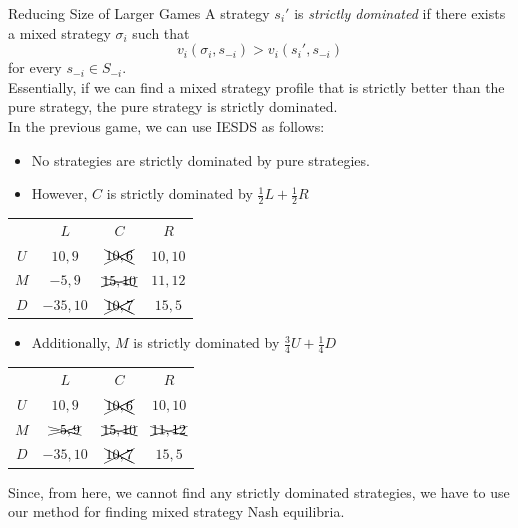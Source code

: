 \documentclass[10pt]{extarticle}
\begin{document}
  \begin{problem}{Reducing Size of Larger Games}
    A strategy $s_i'$ is \textit{strictly dominated} if there exists a mixed strategy $\sigma_i$ such that
    \[
      v_i(\sigma_i,s_{-i}) > v_i(s_i',s_{-i})
    \] 
    for every $s_{-i}\in S_{-i}$.\\

    Essentially, if we can find a mixed strategy profile that is strictly better than the pure strategy, the pure strategy is strictly dominated.\\

    In the previous game, we can use IESDS as follows:
    \begin{itemize}
      \item No strategies are strictly dominated by pure strategies.
      \item However, $C$ is strictly dominated by $\frac{1}{2}L + \frac{1}{2}R$
    \end{itemize}
    \begin{center}
      \renewcommand{\arraystretch}{1.5}
      \begin{tabular}{c|c|c|c|}
        \multicolumn{1}{c}{} & \multicolumn{1}{c}{$L$} & \multicolumn{1}{c}{$C$} & \multicolumn{1}{c}{$R$}\\
        \cline{2-4}
        $U$ & $10,9$ & $\xcancel{10,6}$ & $10,10$ \\
        \cline{2-4}
        $M$ & $-5,9$ & $\xcancel{15,10}$ & $11,12$\\
        \cline{2-4}
        $D$ & $-35,10$ & $\xcancel{10,7}$ & $15,5$\\
        \cline{2-4}
      \end{tabular}
    \end{center}
    \begin{itemize}
      \item Additionally, $M$ is strictly dominated by $\frac{3}{4}U + \frac{1}{4}D$
    \end{itemize}
    \begin{center}
      \renewcommand{\arraystretch}{1.5}
      \begin{tabular}{c|c|c|c|}
        \multicolumn{1}{c}{} & \multicolumn{1}{c}{$L$} & \multicolumn{1}{c}{$C$} & \multicolumn{1}{c}{$R$}\\
        \cline{2-4}
        $U$ & $10,9$ & $\xcancel{10,6}$ & $10,10$ \\
        \cline{2-4}
        $M$ & $\xcancel{-5,9}$ & $\xcancel{15,10}$ & $\xcancel{11,12}$\\
        \cline{2-4}
        $D$ & $-35,10$ & $\xcancel{10,7}$ & $15,5$\\
        \cline{2-4}
      \end{tabular}
    \end{center}
    Since, from here, we cannot find any strictly dominated strategies, we have to use our method for finding mixed strategy Nash equilibria.\\


\end{problem}
\end{document}
